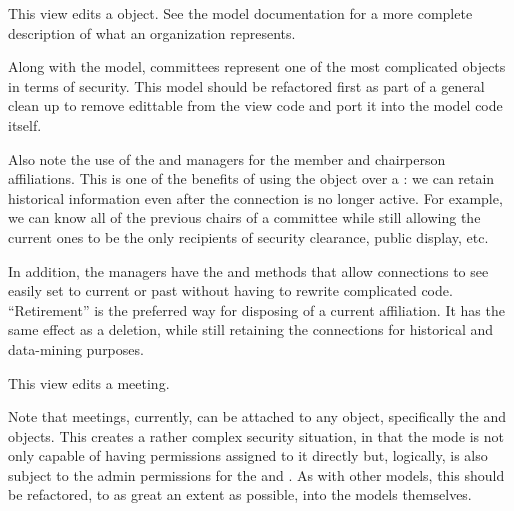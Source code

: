 \documentclass[letterpaper,10pt,english]{sphinxmanual}
\begin{document}
\begin{fulllineitems}
\label{generated/apps.reporting.views:apps.reporting.views.edit_committee}
This view edits a  object.  See the model documentation
for a more complete description of what an organization represents.

Along with the  model, committees represent one of the most
complicated objects in terms of security.  This model should be refactored first
as part of a general clean up to remove edittable from the view code and port
it into the model code itself.

Also note the use of the  and  managers for the member
and chairperson affiliations.  This is one of the benefits of using the 
 object over a : we can retain historical
information even after the connection is no longer active.  For example, 
we can know all of the previous chairs of a committee while still allowing 
the current ones to be the only recipients of security clearance, public display,
etc.

In addition, the  managers have the  and  methods
that allow connections to see easily set to current or past without having to 
rewrite complicated code.  ``Retirement'' is the preferred way for disposing of a current
affiliation.  It has the same effect as a deletion, while still retaining the 
connections for historical and data-mining purposes.

\end{fulllineitems}



\begin{fulllineitems}
\label{generated/apps.reporting.views:apps.reporting.views.edit_meeting}
This view edits a meeting.

Note that meetings, currently, can be attached to any object, specifically the
 and  objects.  This creates a rather complex security
situation, in that the  mode is not only capable of having permissions 
assigned to it directly but, logically, is also subject to the admin permissions for
the  and .  As with other models, this should be 
refactored, to as great an extent as possible, into the models themselves.

\end{fulllineitems}
\end{document}
